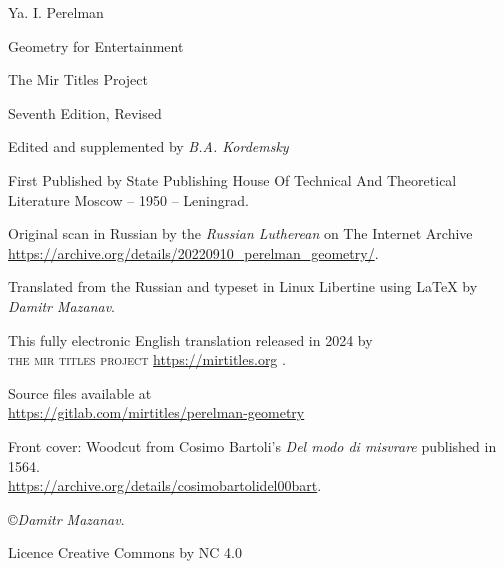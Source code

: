 

\maketitle
\cleardoublepage
\thispagestyle{empty}
\begin{center}

{\LARGE Ya. I. Perelman}

{\Huge Geometry for Entertainment}




The Mir Titles Project

\end{center}
\cleardoublepage

\thispagestyle{empty}
\vfill
\begin{small}

{\noindent
Seventh Edition, Revised

Edited and supplemented by \emph{B.A. Kordemsky}

First Published by State Publishing House Of Technical And Theoretical Literature Moscow -- 1950 -- Leningrad.

Original scan in Russian by the \emph{Russian Lutherean} on The Internet Archive\\ \url{https://archive.org/details/20220910_perelman_geometry/}.

Translated from the Russian and typeset in Linux Libertine using \LaTeX{} by \emph{Damitr Mazanav}.



This fully electronic English translation released in 2024 by \\\textsc{the mir titles project} \url{https://mirtitles.org} .

Source files available at \\ \url{https://gitlab.com/mirtitles/perelman-geometry}
 
Front cover: Woodcut from Cosimo Bartoli's \emph{Del modo di misvrare} published in 1564. \\ \url{https://archive.org/details/cosimobartolidel00bart}.

\copyright \emph{Damitr Mazanav}.

Licence Creative Commons by NC 4.0}

\end{small}

\cleardoublepage

 \tableofcontents
 
